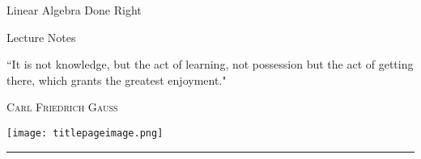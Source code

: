 \begin{titlepage}
\color{Goldenrod}
\pagecolor{titlepagecolor}
\noindent
\titlefont Linear Algebra Done Right \par
\subtitlefont Lecture Notes \par
\epigraph{``It is not knowledge, but the act of learning,
 not possession but the act of getting there,
 which grants the greatest enjoyment."}%
{\textsc{Carl Friedrich Gauss}}
\noindent
\center \texttt{[image: titlepageimage.png]}
\null\vfill
\noindent
\hfill
\begin{minipage}{0.35\linewidth}
    \begin{flushright}
        \printauthor
    \end{flushright}
\end{minipage}
%
\begin{minipage}{0.02\linewidth}
    \rule{1pt}{125pt}
\end{minipage}
\end{titlepage}

\nopagecolor
\fontsize{9}{10}\selectfont
\setcounter{tocdepth}{2} 
\tableofcontents